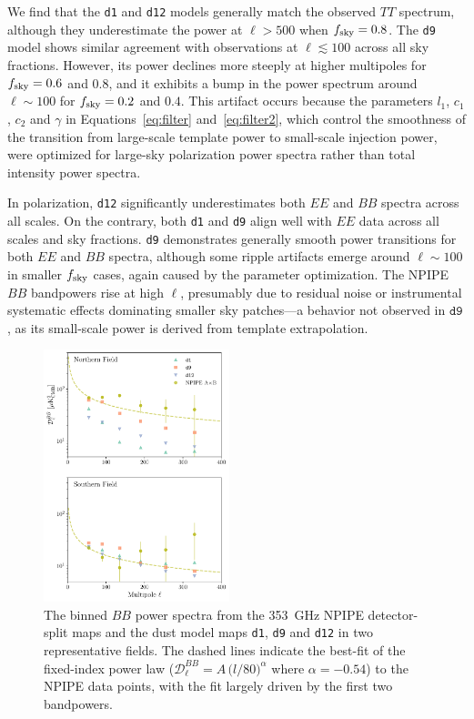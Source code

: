 \documentclass[twocolumn]{aastex631}
\begin{document}
We find that the \texttt{d1} and \texttt{d12} models generally match the observed $TT$ spectrum, although they underestimate the power at $\ell > 500$ when $f_{\rm sky} = 0.8$. The \texttt{d9} model shows similar agreement with observations at $\ell \lesssim 100$ across all sky fractions. However, its power declines more steeply at higher multipoles for $f_{\rm sky} = 0.6$ and $0.8$, and it exhibits a bump in the power spectrum around $\ell \sim 100$ for $f_{\rm sky} = 0.2$ and $0.4$. This artifact occurs because the parameters $l_1$, $c_1$, $c_2$ and $\gamma$ in Equations~\ref{eq:filter} and~\ref{eq:filter2}, which control the smoothness of the transition from large-scale template power to small-scale injection power, were optimized for large-sky polarization power spectra rather than total intensity power spectra. 

In polarization, \texttt{d12} significantly underestimates both $EE$ and $BB$ spectra across all scales. On the contrary, both \texttt{d1} and \texttt{d9} align well with $EE$ data across all scales and sky fractions. \texttt{d9} demonstrates generally smooth power transitions for both $EE$ and $BB$ spectra, although some ripple artifacts emerge around $\ell \sim 100$ in smaller $f_{\rm sky}$ cases, again caused by the parameter optimization. The NPIPE $BB$ bandpowers rise at high $\ell$, presumably due to residual noise or instrumental systematic effects dominating smaller sky patches---a behavior not observed in $\texttt{d9}$, as its small-scale power is derived from template extrapolation. 

\begin{figure}
    \centering
    \includegraphics[width=0.48\textwidth]{figures/smallfield_power.pdf}
    \caption{The binned $BB$ power spectra from the 353~GHz NPIPE detector-split maps and the dust model maps \texttt{d1}, \texttt{d9} and \texttt{d12} in two representative fields. The dashed lines indicate the best-fit of the fixed-index power law ($\mathcal{D}_\ell^{BB} = A \, \big( l/80 \big)^{\alpha}$ where $\alpha = -0.54$) to the NPIPE data points, with the fit largely driven by the first two bandpowers.}
    \label{fig:smallfield_power}
\end{figure}
\end{document}
